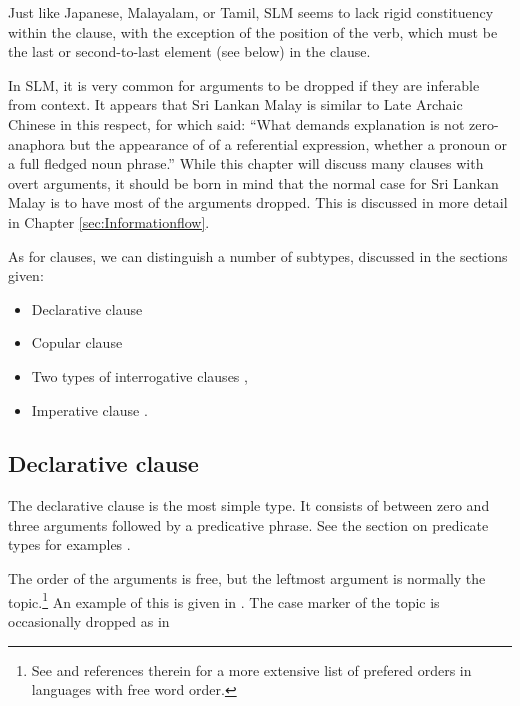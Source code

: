 Just like Japanese, Malayalam, or Tamil,  SLM seems to lack  rigid constituency within the clause, with the exception of the position of the verb, which must be the last or second-to-last element (see below) in the clause.

In SLM, it is very common for arguments to be dropped if they are inferable from context. It appears that Sri Lankan Malay is similar to Late Archaic Chinese in this respect, for which  \citet{Li1997zero} said: ``What demands explanation is not zero-anaphora \el{} but the appearance of of a referential expression, whether a pronoun or a full fledged noun phrase.'' While this chapter will discuss many clauses with overt arguments, it should be born in mind that the normal case for Sri Lankan Malay is to have most of the arguments dropped. This is discussed in more detail in Chapter \ref{sec:Informationflow}.



As for clauses, we can distinguish a number of subtypes, discussed in the   sections given:

\begin{itemize}
 \item Declarative clause 
\item Copular clause 
\item Two types of interrogative clauses , 
\item Imperative clause .
\end{itemize} 

\subsection{Declarative clause}\label{sec:cls:Declarativeclause}
The declarative clause is the most simple type. It consists of between zero and three arguments followed by a predicative phrase. See the section on predicate types for examples .



The order of the arguments is free, but the leftmost argument is normally the topic.\footnote{See \citet[62]{Bayer2004} and references therein for a more extensive list of prefered orders in languages with free word order.} An example of this is given in . The case marker of the topic is occasionally dropped as in   
 
